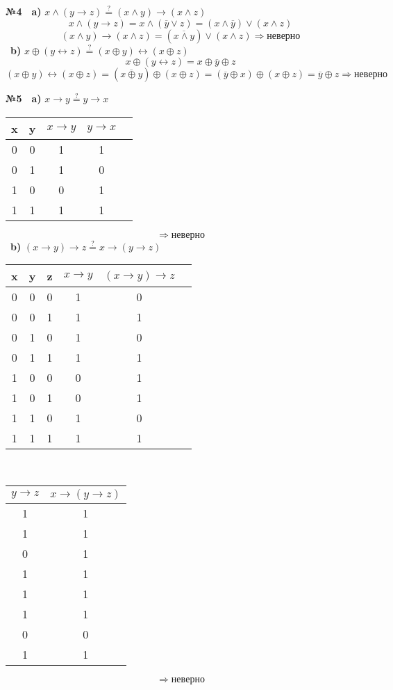\documentclass[a4paper, 12pt]{article}
\begin{document}
	\textbf{№4}\
	\
	\textbf{a)} $x \wedge (y \rightarrow z) \stackrel{?}{=} (x \wedge y) \rightarrow (x \wedge z)$
	\[
		x \wedge (y \rightarrow z) = x \wedge (\overline{y} \vee z) = (x \wedge \overline{y}) \vee (x \wedge z) 
	\]
	\[
		(x \wedge y) \rightarrow (x \wedge z) = (\overline{x \wedge y}) \vee (x \wedge z) \Rightarrow неверно
	\]
	\
	\textbf{b)} $x \oplus (y \leftrightarrow z) \stackrel{?}{=} (x \oplus y) \leftrightarrow (x \oplus z)$
	\[
		x \oplus (y \leftrightarrow z) = x \oplus \overline{y} \oplus z
	\]
	\[
		(x \oplus y) \leftrightarrow (x \oplus z) = (\overline{x \oplus y}) \oplus (x \oplus z) = (\overline{y} \oplus x) \oplus (x \oplus z)	= \overline{y} \oplus z \Rightarrow неверно 
	\]
			
	\textbf{№5}\
	\
	\textbf{a)} $x \rightarrow y \stackrel{?}{=} y \rightarrow x$
	\begin{table}[H]
		\centering	
		\begin{tabular}{|c|c|c|c|c|}
			\hline
			x & y & $x \rightarrow y$ & $y \rightarrow x$ \\ \hline
 			0 & 0 & 1 & 1 \\ \hline
			0 & 1 & 1 & 0 \\ \hline
			1 & 0 & 0 & 1 \\ \hline
			1 & 1 & 1 & 1 \\ \hline	
		\end{tabular}
	\end{table}
	\[
		\Rightarrow неверно
	\]
	\
	\textbf{b)} $(x \rightarrow y) \rightarrow z \stackrel{?}{=} x \rightarrow (y \rightarrow z)$
	
		\begin{table}[H]
		\centering	
		\begin{tabular}{|c|c|c|c|c|c|}
			\hline
			x & y & z & $x \rightarrow y$ & $(x \rightarrow y) \rightarrow z$ \\ \hline
			0 & 0 & 0 & 1 & 0 \\ \hline
			0 & 0 & 1 & 1 & 1 \\ \hline
			0 & 1 & 0 & 1 & 0 \\ \hline
			0 & 1 & 1 & 1 & 1 \\ \hline	
			1 & 0 & 0 & 0 & 1 \\ \hline
			1 & 0 & 1 & 0 & 1 \\ \hline
			1 & 1 & 0 & 1 & 0 \\ \hline
			1 & 1 & 1 & 1 & 1 \\ \hline
		\end{tabular}
		\
		\begin{tabular}{|c|c|}
			\hline
			$y \rightarrow z$ & $x \rightarrow (y \rightarrow z)$ \\ \hline
			1 & 1 \\ \hline
			1 & 1 \\ \hline
			0 & 1 \\ \hline
			1 & 1 \\ \hline	
			1 & 1 \\ \hline
			1 & 1 \\ \hline
			0 & 0 \\ \hline
			1 & 1 \\ \hline
		\end{tabular}
	\end{table}
	\[
	\Rightarrow неверно
	\]
	
\end{document}
